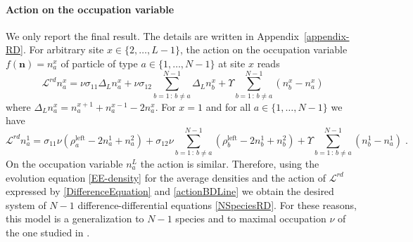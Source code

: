 \documentclass[10pt]{article}
\numberwithin{equation}{section}
\numberwithin{equation}{subsection}
\newcommand{\dt}{\;.}
\begin{document}
{\paragraph{Action on the occupation variable}
We only report the final result. The details are written in Appendix~\ref{appendix-RD}. For arbitrary site $x\in \{2,\ldots,L-1\}$, the action on the occupation variable $f(\bm{n})=n_{a}^{x}$ of particle of type $a\in \{1,\ldots,N-1\}$ at site $x$ reads
\begin{equation}\label{DifferenceEquation}
	\mathcal{L}^{rd}n_{a}^{x}=\nu\sigma_{11}\Delta_{L}n_{a}^{x}+\nu\sigma_{12}\sum_{b=1\,:\,b\neq a}^{N-1}\Delta_{L}n_{b}^{x}+\Upsilon\sum_{b=1\,:\,b\neq a}^{N-1}(n_{b}^{x}-n_{a}^{x})
\end{equation}
where $\Delta_{L}n_{a}^{x}= n_{a}^{x+1}+n_{a}^{x-1}-2n_{a}^{x}$. For $x=1$ and for all $a\in \{1,\ldots,N-1\}$ we have 
\begin{equation}\label{actionBDLine}
	\mathcal{L}^{rd}n_{a}^{1}=\sigma_{11}\nu \left(\rho_{a}^{\text{left}}-2n_{a}^{1}+n_{a}^{2}\right)+\sigma_{12}\nu\sum_{b=1\,:\,b\neq a}^{N-1}\left(\rho_{b}^{\text{left}}-2n_{b}^{1}+n_{b}^{2}\right)+\Upsilon\sum_{b=1\,:\,b\neq a}^{N-1}\left(n_{b}^{1}-n_{a}^{1}\right)\dt
\end{equation}
On the occupation variable $n_{a}^{L}$ the action is similar. Therefore, using the evolution equation \eqref{EE-density} for the average densities and  the action of $\mathcal{L}^{rd}$ expressed by \eqref{DifferenceEquation} and \eqref{actionBDLine} we obtain the desired system of $N-1$ difference-differential equations \eqref{NSpeciesRD}. For these reasons, this model is a generalization to $N-1$ species and to maximal occupation $\nu$ of the one studied in \cite{casini2022uphill}. 
}
\end{document}
